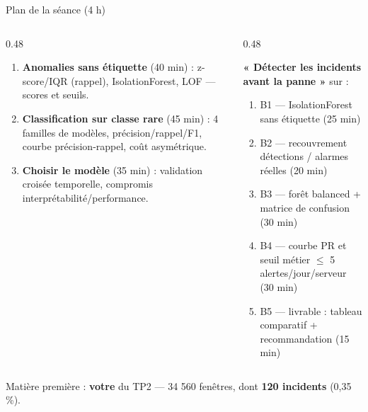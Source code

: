 \begin{frame}{Plan de la séance (4 h)}
\begin{columns}[t]
\begin{column}{0.48\textwidth}
\begin{kbox}
\begin{enumerate}
\item \textbf{Anomalies sans étiquette} (40 min) : z-score/IQR (rappel),
IsolationForest, LOF --- scores et seuils.
\item \textbf{Classification sur classe rare} (45 min) : 4 familles de
modèles, précision/rappel/F1, courbe précision-rappel, coût asymétrique.
\item \textbf{Choisir le modèle} (35 min) : validation croisée
temporelle, compromis interprétabilité/performance.
\end{enumerate}
\end{kbox}
\end{column}
\begin{column}{0.48\textwidth}
\begin{ebox}
\textbf{« Détecter les incidents avant la panne »} sur
 :
\begin{enumerate}
\item B1 --- IsolationForest sans étiquette (25 min)
\item B2 --- recouvrement détections / alarmes réelles (20 min)
\item B3 --- forêt balanced + matrice de confusion (30 min)
\item B4 --- courbe PR et seuil métier $\le$ 5 alertes/jour/serveur (30 min)
\item B5 --- livrable : tableau comparatif + recommandation (15 min)
\end{enumerate}
\end{ebox}
\end{column}
\end{columns}
\vspace{1mm}
\begin{center}\small
Matière première : \textbf{votre}  du TP2 ---
34 560 fenêtres, dont \textbf{120 incidents} (0,35 \%).
\end{center}
\end{frame}

